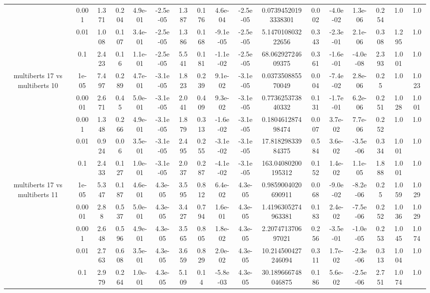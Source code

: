\begin{tabular}{|c|c|c|c|c|c|c|c|c|c|c|c|c|c|c|c|c|}
 & 0.001 & 1.371 & 0.204 & 4.9e-01 & -2.5e-05 & 1.387 & 0.176 & 4.6e-04 & -2.5e-05 & 0.07394520193338301 & 0.002 & -4.0e-02 & 1.3e-06 & 0.254 & 1.0 & 1.0 \\
 & 0.01 & 1.008 & 0.107 & 3.4e-01 & -2.5e-05 & 1.386 & 0.168 & -9.1e-05 & -2.5e-05 & 5.147010803222656 & 0.343 & -2.3e-01 & 2.1e-06 & 0.308 & 1.295 & 1.0 \\
 & 0.1 & 2.423 & 0.16 & 1.1e-01 & -2.5e-05 & 5.541 & 0.181 & -1.1e-02 & -2.5e-05 & 68.06292724609375 & 0.361 & -1.6e-01 & -4.0e-08 & 2.393 & 1.001 & 1.0 \\
\hline
\multirow{5}{*}{multiberts 17 vs multiberts 10} & 1e-05 & 7.497 & 0.289 & 4.7e-01 & -3.1e-05 & 1.823 & 0.239 & 9.1e-02 & -3.1e-05 & 0.037350885570049 & 0.004 & -7.4e-02 & 2.8e-06 & 0.25 & 1.0 & 1.023 \\
 & 0.0001 & 2.671 & 0.45 & 5.0e-01 & -3.1e-05 & 2.041 & 0.409 & 9.3e-02 & -3.1e-05 & 0.773625373840332 & 0.131 & -1.7e-01 & 6.2e-06 & 0.251 & 1.028 & 1.001 \\
 & 0.001 & 1.348 & 0.266 & 4.9e-01 & -3.1e-05 & 1.879 & 0.313 & -1.6e-02 & -3.1e-05 & 0.180461287498474 & 0.007 & 3.7e-02 & 7.7e-06 & 0.252 & 1.0 & 1.0 \\
 & 0.01 & 0.924 & 0.06 & 3.5e-01 & -3.1e-05 & 2.495 & 0.255 & -3.1e-02 & -3.1e-05 & 17.81829833984375 & 0.584 & 3.6e-02 & -3.5e-06 & 0.334 & 1.001 & 1.0 \\
 & 0.1 & 2.433 & 0.127 & 1.0e-01 & -3.1e-05 & 2.037 & 0.287 & -4.1e-02 & -3.1e-05 & 163.04080200195312 & 0.152 & 1.4e-02 & 1.1e-05 & 1.888 & 1.001 & 1.0 \\
\hline
\multirow{5}{*}{multiberts 17 vs multiberts 11} & 1e-05 & 5.347 & 0.187 & 4.6e-01 & 4.3e-05 & 3.595 & 0.812 & 6.4e-02 & 4.3e-05 & 0.9859004020690911 & 0.068 & -9.0e-02 & -8.2e-06 & 0.25 & 1.059 & 1.029 \\
 & 0.0001 & 2.88 & 0.537 & 5.0e-01 & 4.3e-05 & 3.427 & 0.794 & 1.6e-01 & 4.3e-05 & 1.4196305274963381 & 0.183 & 2.4e-02 & -7.5e-06 & 0.252 & 1.036 & 1.029 \\
 & 0.001 & 2.648 & 0.596 & 4.9e-01 & 4.3e-05 & 3.565 & 0.805 & 1.8e-02 & 4.3e-05 & 2.207471370697021 & 0.256 & -3.5e-01 & -1.0e-05 & 0.253 & 1.045 & 1.074 \\
 & 0.01 & 2.763 & 0.608 & 3.5e-01 & 4.3e-05 & 3.659 & 0.829 & 2.0e-02 & 4.3e-05 & 10.214500427246094 & 0.311 & 1.7e-02 & -2.3e-06 & 0.313 & 1.004 & 1.0 \\
 & 0.1 & 2.979 & 0.264 & 1.0e-01 & 4.3e-05 & 5.109 & 0.14 & -5.8e-03 & 4.3e-05 & 30.189666748046875 & 0.186 & 5.6e-02 & -2.5e-06 & 2.751 & 1.074 & 1.0 \\

\end{tabular}

